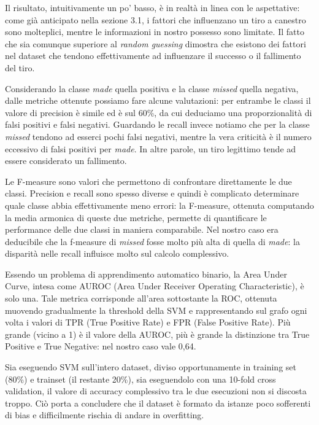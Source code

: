 \par
Il risultato, intuitivamente un po' basso, è in realtà in linea con le aspettative: come già anticipato nella sezione 3.1, i fattori che influenzano un tiro a canestro sono molteplici, mentre le informazioni in nostro possesso sono limitate. Il fatto che sia comunque  superiore al \textit{random guessing} dimostra che esistono dei fattori nel dataset che tendono effettivamente ad influenzare il successo o il fallimento del tiro.

\par
Considerando la classe \textit{made} quella positiva e la classe \textit{missed} quella negativa, dalle metriche ottenute possiamo fare alcune valutazioni: per entrambe le classi il valore di precision è simile ed è sul 60\%, da cui deduciamo una proporzionalità di falsi positivi e falsi negativi.
Guardando le recall invece notiamo che per la classe \textit{missed} tendono ad esserci pochi falsi negativi, mentre la vera criticità è il numero eccessivo di falsi positivi per \textit{made}. In altre parole, un tiro legittimo tende ad essere considerato un fallimento.

Le F-measure sono valori che permettono di confrontare direttamente le due classi. Precision e recall sono spesso diverse e quindi è complicato determinare quale classe abbia effettivamente meno errori: la F-measure, ottenuta computando la media armonica di queste due metriche, permette di quantificare le performance delle due classi in maniera comparabile. Nel nostro caso era deducibile che la f-measure di \textit{missed} fosse molto più alta di quella di \textit{made}: la disparità nelle recall influisce molto sul calcolo complessivo.

Essendo un problema di apprendimento automatico binario, la Area Under Curve, intesa come AUROC (Area Under Receiver Operating Characteristic), è solo una. Tale metrica corrisponde all’area sottostante la ROC, ottenuta muovendo gradualmente la threshold della SVM e rappresentando sul grafo ogni volta i valori di TPR (True Positive Rate) e FPR (False Positive Rate).
Più grande (vicino a 1) è il valore della AUROC, più è grande la distinzione tra True Positive e True Negative: nel nostro caso vale 0,64.

\par
Sia eseguendo SVM sull'intero dataset, diviso opportunamente in training set (80\%) e trainset (il restante 20\%), sia eseguendolo con una 10-fold cross validation, il valore di accuracy complessivo tra le due esecuzioni non si discosta troppo. Ciò porta a concludere che il dataset è formato da istanze poco sofferenti di bias e difficilmente rischia di andare in overfitting.

